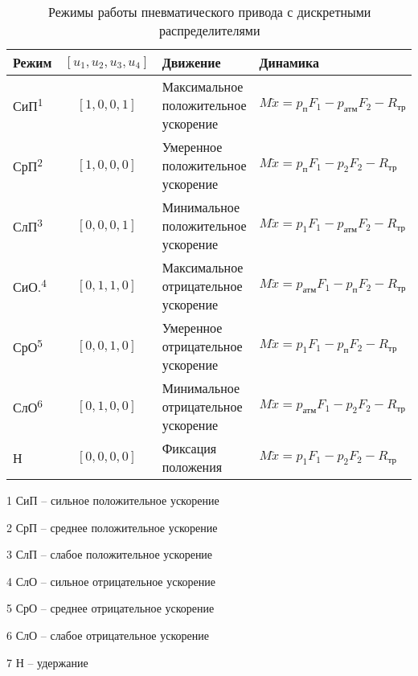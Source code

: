\begin{table}[htbp]
	\centering
	\caption{Режимы работы пневматического привода с дискретными распределителями}
	\label{tab:operation_modes}
	\small
	\begin{tabular}{lcll}
		\midrule
		\textbf{Режим}           & $[u_1,u_2,u_3,u_4]$ & \textbf{Движение} & \textbf{Динамика} \\
		\midrule
		СиП\textsuperscript{1}   & $[1,0,0,1]$         &
		Максимальное положительное ускорение &
		$M\ddot{x} = p_\text{п}F_1 - p_\text{атм}F_2 - R_\text{тр}$                            \\

		СрП\textsuperscript{2}   & $[1,0,0,0]$         &
		Умеренное положительное ускорение &
		$M\ddot{x} = p_\text{п}F_1 - p_2F_2 - R_\text{тр}$                                     \\

		СлП\textsuperscript{3}   & $[0,0,0,1]$         &
		Минимальное положительное ускорение  &
		$M\ddot{x} = p_1F_1 - p_\text{атм}F_2 - R_\text{тр}$                                   \\

		СиО.\textsuperscript{4}  & $[0,1,1,0]$         &
		Максимальное отрицательное ускорение   &
		$M\ddot{x} = p_\text{атм}F_1 - p_\text{п}F_2 - R_\text{тр}$                            \\

		СрО\textsuperscript{5}   & $[0,0,1,0]$         &
		Умеренное отрицательное ускорение   &
		$M\ddot{x} = p_1F_1 - p_\text{п}F_2 - R_\text{тр}$                                     \\

		СлО\textsuperscript{6}   & $[0,1,0,0]$         &
		Минимальное отрицательное ускорение    &
		$M\ddot{x} = p_\text{атм}F_1 - p_2F_2 - R_\text{тр}$                                   \\

		\hline
		Н                        & $[0,0,0,0]$         &
		Фиксация положения       &
		$M\ddot{x} = p_1F_1 - p_2F_2 - R_\text{тр}$                                            \\
		\midrule
	\end{tabular}
	\begin{tablenotes}
		\scriptsize
		\item[1] СиП -- сильное положительное ускорение
		\item[2] СрП -- среднее положительное ускорение
		\item[3] СлП -- слабое положительное ускорение
		\item[4] СлО -- сильное отрицательное ускорение
		\item[5] СрО -- среднее отрицательное ускорение
		\item[6] СлО -- слабое отрицательное ускорение
		\item[7] Н -- удержание
	\end{tablenotes}
\end{table}

